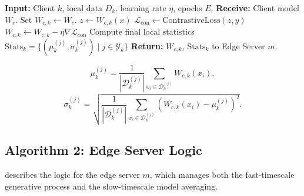 \begin{algorithm}[!ht]
    \caption{H-SFP: Client-Side Training}
    \label{alg:client}
    \begin{algorithmic}[1]
    \State \textbf{Input:} Client $k$, local data $D_k$, learning rate $\eta$, epochs $E$.
    \State \textbf{Receive:} Client model $W_c$.
    \State Set $W_{c,k} \leftarrow W_c$.
            \State $z \leftarrow W_{c,k}(x)$ 
            \State $\mathcal{L}_{\text{con}} \leftarrow \text{ContrastiveLoss}(z, y)$ 
            \State $W_{c,k} \leftarrow W_{c,k} - \eta \nabla \mathcal{L}_{\text{con}}$
        \EndFor
    \EndFor
    \State Compute final local statistics $\text{Stats}_k = \{(\mu_k^{(j)}, \sigma_k^{(j)}) \mid j \in \mathcal{Y}_k\}$
    \State \textbf{Return:} $W_{c,k}$, $\text{Stats}_k$ to Edge Server $m$.
    \end{algorithmic}
\end{algorithm}


\begin{equation}
    \mu_k^{(j)} = \frac{1}{|\mathcal{D}_k^{(j)}|} \sum_{x_i \in \mathcal{D}_k^{(j)}} W_{c,k}(x_i),
    \label{mean_client}
\end{equation}
\begin{equation}
    \sigma_k^{(j)} = \sqrt{\frac{1}{|\mathcal{D}_k^{(j)}|} \sum_{x_i \in \mathcal{D}_k^{(j)}} (W_{c,k}(x_i) - \mu_k^{(j)})^2}.
    \label{std_client}
\end{equation}
\subsection*{Algorithm 2: Edge Server Logic}

 describes the logic for the edge server $m$, which manages both the fast-timescale generative process and the slow-timescale model averaging.

